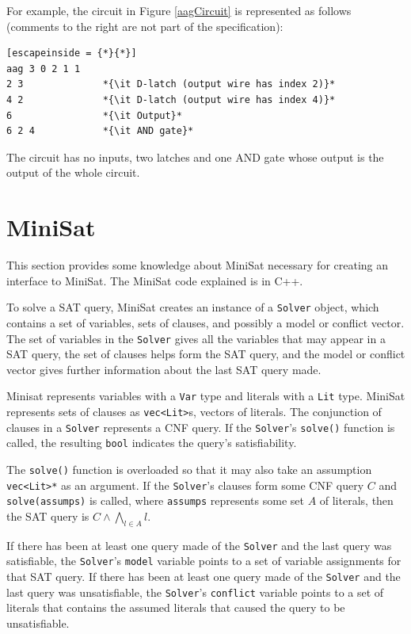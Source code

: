 \documentclass[12pt,a4paper,twoside,openright]{report}
\begin{document}
{{{For example, the circuit in Figure \ref{aagCircuit} is represented
as follows (comments to the right are not part of the specification):
\begin{lstlisting}[escapeinside = {*}{*}]
aag 3 0 2 1 1
2 3              *{\it D-latch (output wire has index 2)}*
4 2              *{\it D-latch (output wire has index 4)}*
6                *{\it Output}*
6 2 4            *{\it AND gate}*
\end{lstlisting}
The circuit has no inputs, two latches and one AND gate
whose output is the output of the whole circuit.
}


\section{MiniSat}
\label{prep:minisat}

This section provides some knowledge about MiniSat necessary
for creating an interface to MiniSat. The MiniSat code
explained is in C++.

To solve a SAT query, MiniSat creates an instance of a \verb,Solver, object,
which contains a set of variables, sets of clauses, and possibly a model or conflict vector.
The set of variables in the \verb,Solver, gives all the variables that may appear in
a SAT query, the set of clauses helps form the SAT query, and the model or conflict vector
gives further information about the last SAT query made.

Minisat represents variables with a \verb,Var, type and
literals with a \verb,Lit, type.
MiniSat represents sets of clauses as \verb,vec<Lit>,s,
vectors of literals. The conjunction of clauses in a \verb,Solver, represents a CNF query.
If the \verb,Solver,'s \verb,solve(), function is called,
the resulting \verb,bool, indicates the query's satisfiability.

The \verb,solve(), function is overloaded so that it may also take an assumption \verb,vec<Lit>*, as
an argument.
If the \verb,Solver,'s clauses form some CNF query $C$ and
\verb,solve(assumps), is called, where \verb,assumps, represents some set $A$ of literals,
then the SAT query is $C \wedge \bigwedge_{l \in A} l$.

If there has been at least one query made of the \verb,Solver, and the last query was
satisfiable, the \verb,Solver,'s \verb,model, variable points to a set of variable assignments
for that SAT query.
If there has been at least one query made of the \verb,Solver, and the last query was
unsatisfiable, the \verb,Solver,'s \verb,conflict, variable points to a set of literals that
contains the assumed literals that caused the query to be unsatisfiable.

}}
\end{document}
